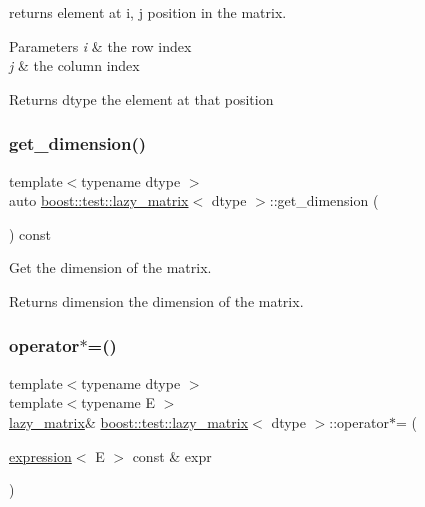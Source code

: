 returns element at i, j position in the matrix. 


\begin{DoxyParams}{Parameters}
{\em i} & the row index \\
\hline
{\em j} & the column index \\
\hline
\end{DoxyParams}
\begin{DoxyReturn}{Returns}
dtype the element at that position 
\end{DoxyReturn}
\mbox{\label{classboost_1_1test_1_1lazy__matrix_abd183543f6cd5e26c70bb14e5df7e904}} 
\subsubsection{\texorpdfstring{get\_dimension()}{get\_dimension()}}
{\footnotesize\ttfamily template$<$typename dtype $>$ \\
auto \mbox{\hyperlink{classboost_1_1test_1_1lazy__matrix}{boost\+::test\+::lazy\+\_\+matrix}}$<$ dtype $>$\+::get\+\_\+dimension (\begin{DoxyParamCaption}{ }\end{DoxyParamCaption}) const\hspace{0.3cm}{\ttfamily [inline]}}



Get the dimension of the matrix. 

\begin{DoxyReturn}{Returns}
dimension the dimension of the matrix. 
\end{DoxyReturn}
\mbox{\label{classboost_1_1test_1_1lazy__matrix_a389c21e3085e09b8b7c3db7c29e163be}} 
\subsubsection{\texorpdfstring{operator$\ast$=()}{operator*=()}}
{\footnotesize\ttfamily template$<$typename dtype $>$ \\
template$<$typename E $>$ \\
\mbox{\hyperlink{classboost_1_1test_1_1lazy__matrix}{lazy\+\_\+matrix}}\& \mbox{\hyperlink{classboost_1_1test_1_1lazy__matrix}{boost\+::test\+::lazy\+\_\+matrix}}$<$ dtype $>$\+::operator$\ast$= (\begin{DoxyParamCaption}\item[{\mbox{\hyperlink{classboost_1_1test_1_1expression}{expression}}$<$ E $>$ const \&}]{expr }\end{DoxyParamCaption})\hspace{0.3cm}{\ttfamily [inline]}}



